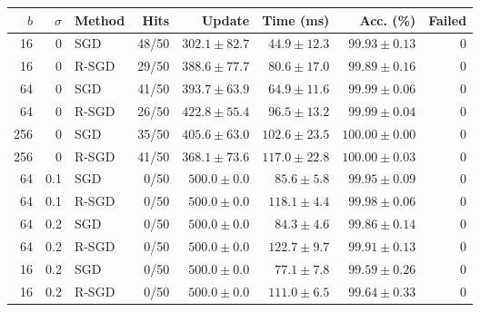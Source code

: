 \begin{tabular}{rrlrrrrr}
\hline
$b$ & $\sigma$ & Method & Hits & Update & Time (ms) & Acc. (\%) & Failed \\
\hline
16 & 0 & SGD & 48/50 & $302.1 \pm 82.7$ & $44.9 \pm 12.3$ & $99.93 \pm 0.13$ & 0 \\
16 & 0 & R-SGD & 29/50 & $388.6 \pm 77.7$ & $80.6 \pm 17.0$ & $99.89 \pm 0.16$ & 0 \\
64 & 0 & SGD & 41/50 & $393.7 \pm 63.9$ & $64.9 \pm 11.6$ & $99.99 \pm 0.06$ & 0 \\
64 & 0 & R-SGD & 26/50 & $422.8 \pm 55.4$ & $96.5 \pm 13.2$ & $99.99 \pm 0.04$ & 0 \\
256 & 0 & SGD & 35/50 & $405.6 \pm 63.0$ & $102.6 \pm 23.5$ & $100.00 \pm 0.00$ & 0 \\
256 & 0 & R-SGD & 41/50 & $368.1 \pm 73.6$ & $117.0 \pm 22.8$ & $100.00 \pm 0.03$ & 0 \\
64 & 0.1 & SGD & 0/50 & $500.0 \pm 0.0$ & $85.6 \pm 5.8$ & $99.95 \pm 0.09$ & 0 \\
64 & 0.1 & R-SGD & 0/50 & $500.0 \pm 0.0$ & $118.1 \pm 4.4$ & $99.98 \pm 0.06$ & 0 \\
64 & 0.2 & SGD & 0/50 & $500.0 \pm 0.0$ & $84.3 \pm 4.6$ & $99.86 \pm 0.14$ & 0 \\
64 & 0.2 & R-SGD & 0/50 & $500.0 \pm 0.0$ & $122.7 \pm 9.7$ & $99.91 \pm 0.13$ & 0 \\
16 & 0.2 & SGD & 0/50 & $500.0 \pm 0.0$ & $77.1 \pm 7.8$ & $99.59 \pm 0.26$ & 0 \\
16 & 0.2 & R-SGD & 0/50 & $500.0 \pm 0.0$ & $111.0 \pm 6.5$ & $99.64 \pm 0.33$ & 0 \\
\hline
\end{tabular}
